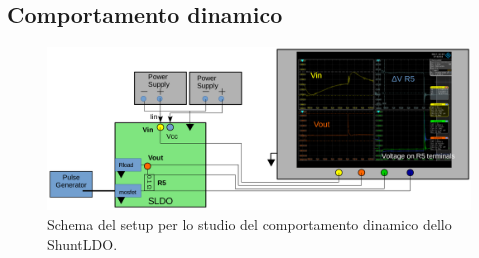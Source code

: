 %
%


\subsection{Comportamento dinamico}

\begin{figure}[!htb]
\centering
\includegraphics[scale=.3]{Immagini/SetupScheme}
\caption{Schema del setup per lo studio del comportamento dinamico dello ShuntLDO.}
\label{Setupscheme}
\end{figure}

